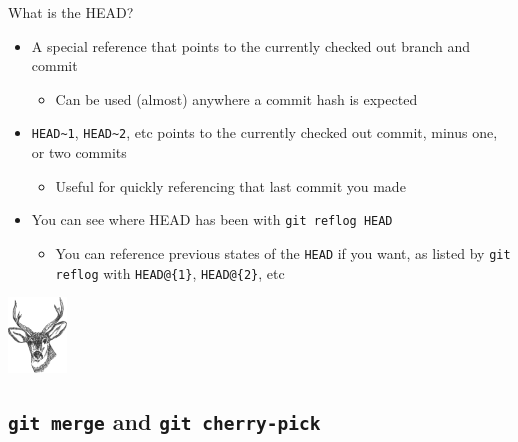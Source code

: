 \documentclass[aspectratio=43]{beamer}
\begin{document}
\begin{frame}[fragile]{What is the HEAD?}
    \begin{itemize}
    \item A special reference that points to the currently checked out
        branch and commit
        \begin{itemize}
        \item Can be used (almost) anywhere a commit hash is expected
        \end{itemize}
    \item \texttt{HEAD\textasciitilde{}1}, \texttt{HEAD\textasciitilde{}2}, etc
        points to the currently checked out commit, minus one, or two commits
        \begin{itemize}
        \item Useful for quickly referencing that last commit you made
        \end{itemize}
    \item You can see where HEAD has been with \texttt{git reflog HEAD}
        \begin{itemize}
        \item You can reference previous states of the \texttt{HEAD} if you
            want, as listed by \texttt{git reflog} with \verb|HEAD@{1}|,
            \verb|HEAD@{2}|, etc
        \end{itemize}
    \end{itemize}
    \begin{flushright}
        \includegraphics[height=2cm]{resources/deer_head.pdf}
    \end{flushright}
\end{frame}

\subsection{\texttt{git merge} and \texttt{git cherry-pick}}
\end{document}
